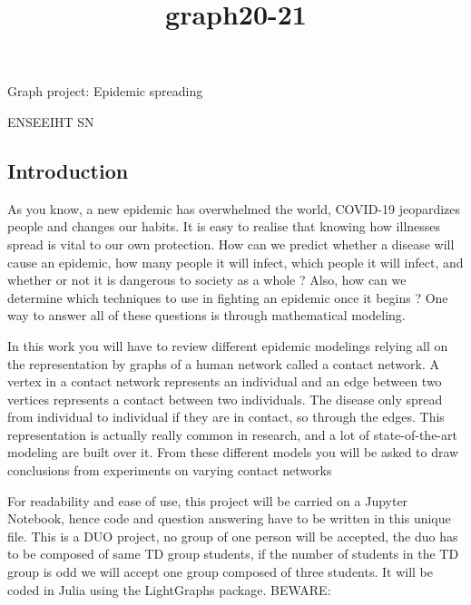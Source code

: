 \documentclass[11pt]{article}
\title{graph20-21}
\begin{document}
    
    
    \maketitle
    
    

    
    Graph project: Epidemic spreading

ENSEEIHT SN

    \subsection{Introduction}\label{introduction}

As you know, a new epidemic has overwhelmed the world, COVID-19
jeopardizes people and changes our habits. It is easy to realise that
knowing how illnesses spread is vital to our own protection. How can we
predict whether a disease will cause an epidemic, how many people it
will infect, which people it will infect, and whether or not it is
dangerous to society as a whole ? Also, how can we determine which
techniques to use in fighting an epidemic once it begins ? One way to
answer all of these questions is through mathematical modeling.

In this work you will have to review different epidemic modelings
relying all on the representation by graphs of a human network called a
contact network. A vertex in a contact network represents an individual
and an edge between two vertices represents a contact between two
individuals. The disease only spread from individual to individual if
they are in contact, so through the edges. This representation is
actually really common in research, and a lot of state-of-the-art
modeling are built over it. From these different models you will be
asked to draw conclusions from experiments on varying contact networks

For readability and ease of use, this project will be carried on a
Jupyter Notebook, hence code and question answering have to be written
in this unique file. This is a DUO project, no group of one person will
be accepted, the duo has to be composed of same TD group students, if
the number of students in the TD group is odd we will accept one group
composed of three students. It will be coded in Julia using the
LightGraphs package. BEWARE:
\end{document}
